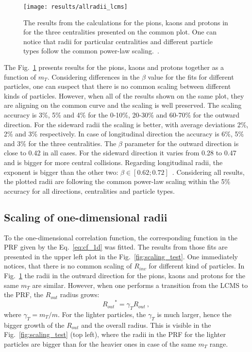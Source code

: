       \begin{figure}[b]
        \centering
        \centerline{\texttt{[image: results/allradii\_lcms]}}
        \caption{The results from the calculations for the pions, kaons and protons in for the three centralities presented on the common plot. One can notice that radii for particular centralities and different particle types follow the common power-law scaling.~\cite{galazyn}.}
      \label{fig:allradii}
      \end{figure}    

      The Fig.~\ref{fig:allradii} presents results for the pions, kaons and protons together as a function of $m_T$.
      Considering differences in the $\beta$ value for the fits for different particles, one can suspect that there is no common scaling between different kinds of particles.
      However, when all of the results shown on the same plot, they are aligning on the common curve and the scaling is well preserved.
      The scaling accuracy is 3\%, 5\% and 4\% for the 0-10\%, 20-30\% and 60-70\% for the outward direction.
      For the sideward radii the scaling is better, with average deviations 2\%, 2\% and 3\% respectively.
      In case of longitudinal direction the accuracy is 6\%, 5\% and 3\% for the three centralities.
      The $\beta$ parameter for the outward direction is close to 0.42 in all cases.
      For the sideward direction it varies from 0.28 to 0.47 and is bigger for more central collisions.
      Regarding longitudinal radii, the exponent is bigger than the other two: $\beta \in [0.62 ; 0.72]$~.
      Considering all results, the plotted radii are following the common power-law scaling within the 5\% accuracy for all directions, centralities and particle types.
      \FloatBarrier
      \subsection{Scaling of one-dimensional radii}
      To the one-dimensional correlation function, the corresponding function in the PRF given by the Eq.~\ref{eq:cf_1d} was fitted.
      The results from those fits are presented in the upper left plot in the Fig.~\ref{fig:scaling_test}.
      One immediately notices, that there is no common scaling of $R_{inv}$ for different kind of particles.
      In Fig.~\ref{fig:allradii} the radii in the outward direction for the pions, kaons and protons for the same $m_T$ are similar.
      However, when one performs a transition from the LCMS to the PRF, the $R_{out}$ radius grows:
      \begin{equation}
        {R_{out}}^{*} = \gamma_T R_{out}~,
      \end{equation}
      where $\gamma_T = m_T / m$.
      For the lighter particles, the $\gamma_T$ is much larger, hence the bigger growth of the $R_{out}$ and the overall radius.
      This is visible in the Fig.~\ref{fig:scaling_test} (top left), where the radii in the PRF for the lighter particles are bigger than for the heavier ones in case of the same $m_T$ range.

